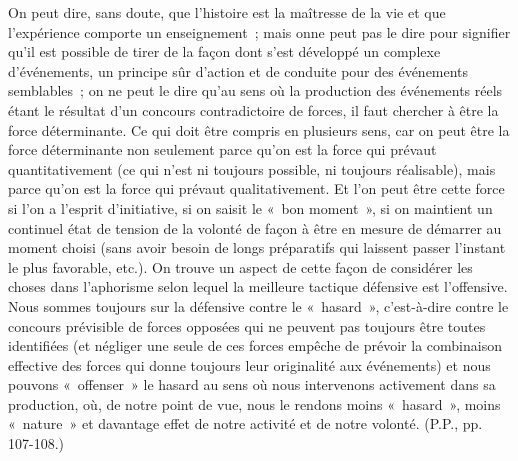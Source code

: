 \documentclass[french,twoside]{book} %
\begin{document}
\noindent On peut dire, sans doute, que l’histoire est la maîtresse de la vie et que l’expérience comporte un enseignement ; mais onne peut pas le dire pour signifier qu’il est possible de tirer de la façon dont s’est développé un complexe d’événements, un principe sûr d’action et de conduite pour des événements semblables ; on ne peut le dire qu’au sens où la production des événements réels étant le résultat d’un concours contradictoire de forces, il faut chercher à être la force déterminante. Ce qui doit être compris en plusieurs sens, car on peut être la force déterminante non seulement parce qu’on est la force qui prévaut quantitativement (ce qui n’est ni toujours possible, ni toujours réalisable), mais parce qu’on est la force qui prévaut qualitativement. Et l’on peut être cette force si l’on a l’esprit d’initiative, si on saisit le « bon moment », si on maintient un continuel état de tension de la volonté de façon à être en mesure de démarrer au moment choisi (sans avoir besoin de longs préparatifs qui laissent passer l’instant le plus favorable, etc.). On trouve un aspect de cette façon de considérer les choses dans l’aphorisme selon lequel la meilleure tactique défensive est l’offensive. Nous sommes toujours sur la défensive contre le « hasard », c’est-à-dire contre le concours prévisible de forces opposées qui ne peuvent pas toujours être toutes identifiées (et négliger une seule de ces forces empêche de prévoir la combinaison effective des forces qui donne toujours leur originalité aux événements) et nous pouvons « offenser » le hasard au sens où nous intervenons activement dans sa production, où, de notre point de vue, nous le rendons moins « hasard », moins « nature » et davantage effet de notre activité et de notre volonté. (P.P., pp. 107-108.)\par
{\raggedleft \noindent [1932]}
\end{document}
